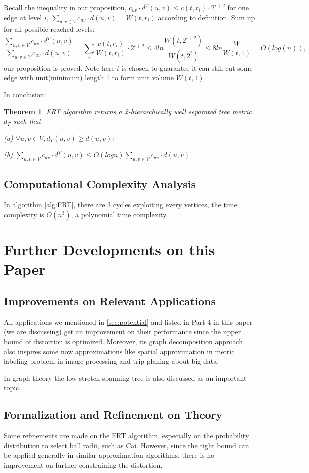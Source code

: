 \documentclass[11pt,twocolumn]{IEEEtran}
\newtheorem{Theorem}{Theorem}[section]
\begin{document}
Recall the inequality in our proposition, $c_{uv}\cdot d^T(u,v) \leq c(t,r_i)\cdot 2^{i+2}$ for one edge at level $i$, 
$\sum_{u,v\in V}c_{uv}\cdot d(u,v) = W(t,r_i)$ according to definition. Sum up for all possible reached levels:
$$\frac{\sum_{u,v\in V}c_{uv}\cdot d^T(u,v)}{\sum_{u,v\in V}c_{uv}\cdot d(u,v)}=\sum_i\frac{c(t,r_i)}{W(t,r_i)}\cdot 2^{i+2} \leq 4ln\frac{W(t,2^{i+2})}{W(t,2^i)} \leq 8ln\frac{W}{W(t,1)} = O(log(n)),$$
our proposition is proved. Note here $t$ is chosen to guarantee it can still cut some edge with unit(minimum)
length 1 to form unit volume $W(t,1)$.

In conclusion:
\begin{Theorem}
FRT algorithm returns a 2-hierarchically well separated tree metric $d_T$ such that\par
(a) $\forall u,v \in V, d_T(u,v)\geq d(u,v)$;\par
(b) $\sum_{u,v\in V}c_{uv}\cdot d^T(u,v)\leq O(logn)\sum_{u,v\in V}c_{uv}\cdot d(u,v)$.
\end{Theorem}
\subsection{Computational Complexity Analysis}
In algorithm \ref{alg:FRT}, there are 3 cycles exploiting every vertices, the time complexity is 
$O(n^3)$, a polynomial time complexity.

\section{Further Developments on this Paper}
\subsection{Improvements on Relevant Applications}
\label{sec:app}
All applications we mentioned in \ref{sec:potential} and listed in Part 4 in this paper (we are discussing)
get an improvement on their performance since the upper bound of distortion is optimized. Moreover,
its graph decomposition approach also inspires some now approximations like spatial approximation in
metric labeling problem in image processing\cite{metriclabel} and trip planing about big data\cite{plan}.

In graph theory the low-stretch spanning tree is also discussed as an important topic\cite{lowspan}.
\subsection{Formalization and Refinement on Theory}
Some refinements are made on the FRT algorithm, especially on the probability distribution to select 
ball radii, such as Cai\cite{RMOP}. However, since the tight bound can be applied generally in
similar approximation algorithms, there is no improvement on further constraining the distortion.
\end{document}
